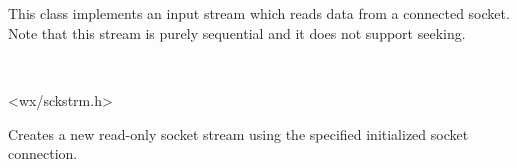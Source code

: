 
\section{}\label{wxsocketinputstream}

This class implements an input stream which reads data from
a connected socket. Note that this stream is purely sequential
and it does not support seeking.


\\


<wx/sckstrm.h>






\label{wxsocketinputstreamctor}


Creates a new read-only socket stream using the specified initialized
socket connection. 

\section{}\label{wxsocketoutputstream}

